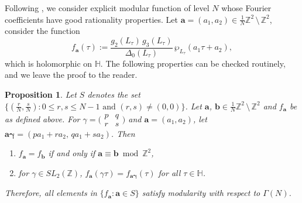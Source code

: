 \documentclass[11pt, reqno]{amsart}
\newtheorem{prop}[theorem]{Proposition}
\begin{document}
Following \cite[Chapter 6]{shimura}, we consider explicit modular function of level $N$ whose Fourier coefficients have good rationality properties. Let $\boldsymbol{a}=(a_1,a_2)\in \frac{1}{N}\mathbb{Z}^2 \,\setminus \,\mathbb{Z}^2$, consider the function
$$
f_{\boldsymbol{a}}(\tau):=\frac{g_2(L_\tau)\,g_3(L_\tau)}{\Delta_0(L_\tau)}\, \wp_{L_\tau} (a_1\tau+a_2),
$$
which is holomorphic on $\mathbb{H}$. The following properties can be checked routinely, and we leave the proof to the reader.
\begin{prop}
Let $S$ denotes the set $\{\left(\frac{r}{N},\frac{s}{N}\right): 0\leq r,s\leq N-1 \text{ and }(r,s)\neq(0,0)\}$. Let $\boldsymbol{a}$, $\boldsymbol{b} \in \frac{1}{N}\mathbb{Z}^2 \,\setminus \,\mathbb{Z}^2$ and $f_{\boldsymbol{a}}$ be as defined above. For $\gamma = \big(\begin{smallmatrix}
p & q\\
r & s
\end{smallmatrix}\big)$ and $\boldsymbol{a} = (a_1,a_2)$, let ${\boldsymbol{a\gamma}=(pa_1+ra_2, \, qa_1+sa_2)}$. Then
\begin{enumerate}
    \item[(a)] $f_{\boldsymbol{a}} = f_{\boldsymbol{b}}$ if and only if $\boldsymbol{a} \equiv \boldsymbol{b} \bmod \mathbb{Z}^2 $,
    \item[(b)] for $\gamma \in SL_2(\mathbb{Z})$, $f_{\boldsymbol{a}} (\gamma \tau) = f_{\boldsymbol{a\gamma}}(\tau)$ for all $\tau \in \mathbb{H}$.
\end{enumerate}
Therefore, all elements in $\{f_{\boldsymbol{a}}: \boldsymbol{a} \in S\}$ satisfy modularity with respect to $\Gamma(N)$.
\end{prop}
\end{document}
